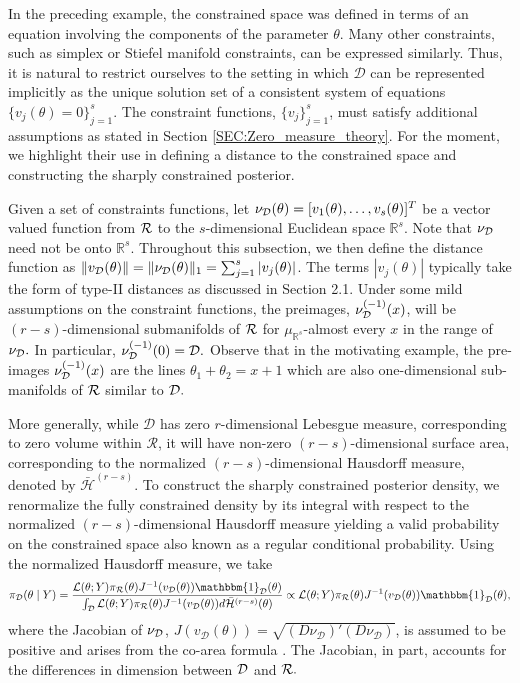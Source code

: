 \documentclass[10pt,fleqn]{article}
\DeclareMathOperator{\1}{\mathbbm{1}} \DeclareMathOperator{\bigO}{\mc O}
\begin{document}
In the preceding example, the constrained space was defined in terms of an equation involving the components of the parameter $\theta$.  Many other constraints, such as simplex or Stiefel manifold constraints, can be expressed similarly. Thus, it is natural to restrict ourselves to the setting in which $\mathcal{D}$ can be represented implicitly
as the unique solution set of a consistent system of equations $\{v_j(\theta) =
0\}_{j=1}^s$. The constraint functions, $\{v_j\}_{j=1}^s$, must satisfy additional assumptions as stated in Section \ref{SEC:Zero_measure_theory}. For the moment, we highlight their use in defining a distance to the constrained space and constructing the sharply constrained posterior.  

Given a set of constraints functions, let $\nu_{\mathcal{D}}(\theta) =[v_1(\theta),\dots,v_s(\theta)]^T$ be a vector valued function from $\mathcal{R}$ to the $s$-dimensional Euclidean space $\mathbb{R}^s$.  Note that $\nu_{\mathcal{D}}$ need not be onto $\mathbb{R}^s.$ Throughout this subsection, we then define the distance function as $\|v_\mathcal{D}(\theta)\| = \| \nu_{\mathcal{D}}(\theta) \| _1 =\sum_{j=1}^s | v_j(\theta)|$.  The terms $|v_j(\theta)|$ typically take the form of type-II distances as discussed in Section 2.1.  Under some mild assumptions on the constraint functions, the preimages, $\nu_{\mathcal{D}}^{(-1)}(x)$, will be $(r-s)$-dimensional submanifolds of $\mathcal{R}$ for $\mu_{\mathbb{R}^s}$-almost every $x$ in the range of $\nu_{\mathcal{D}}.$ In particular, $\nu_{\mathcal{D}}^{(-1)}(0) = \mathcal{D}.$ Observe that in the motivating example, the pre-images $\nu_{\mathcal{D}}^{(-1)}(x)$ are the lines $\theta_1+\theta_2 = x+1$ which are also one-dimensional sub-manifolds of $\mathcal{R}$ similar to $\mathcal{D}.$  

More generally, while $\mathcal{D}$ has zero $r$-dimensional Lebesgue measure, corresponding to zero volume within $\mathcal{R}$, it will have non-zero $(r-s)$-dimensional surface area, corresponding to the 
normalized $(r-s)$-dimensional Hausdorff measure, denoted by $\bar{\mathcal{H}}^{(r-s)}$.  To construct the sharply constrained posterior density, we renormalize the fully constrained density by its integral with respect to the normalized $(r-s)$-dimensional Hausdorff measure yielding a valid probability on the constrained space also known as a regular conditional probability. 
Using the normalized Hausdorff measure, we take
$$\pi_{\mc D}(\theta \mid Y) = \dfrac{
{\mathcal{L}(\theta;Y)\pi_\mathcal{R}(\theta)}{J^{-1}(v_\mathcal{D}(\theta))
\mathbbm{1}_{\mc D}(\theta)
}
} {\int_\mathcal{D}
{\mathcal{L}(\theta;Y)\pi_\mathcal{R}(\theta)}{J^{-1}(v_\mathcal{D}(\theta))}
d\bar{\mathcal{H}}^{(r-s)}(\theta)} \propto
{\mathcal{L}(\theta;Y)\pi_\mathcal{R}(\theta)}{J^{-1}(v_\mathcal{D}(\theta))
\mathbbm{1}_{\mc D}(\theta)
},
$$
where the Jacobian of $\nu_{\mathcal{D}}$, $J(v_\mathcal{D}(\theta)) =
\sqrt{(D\nu_\mathcal{D})'(D\nu_\mathcal{D})}$, is assumed to be positive and arises from the co-area formula \citep{federer2014geometric}.  The Jacobian, in part, accounts for the differences in dimension between $\mathcal{D}$ and $\mathcal{R}.$
\end{document}
